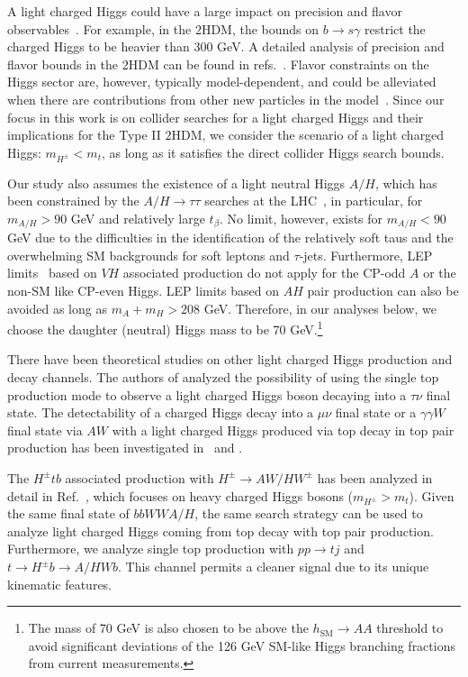  A light charged Higgs could have a large impact on precision and flavor observables~\cite{Olive2016}. For example, in the $2$HDM, the bounds on $b\rightarrow s\gamma$ restrict the charged Higgs to be heavier than 300 GeV. A detailed analysis of precision and flavor bounds in the $2$HDM can be found in refs.~\cite{Coleppa:2013dya,Mahmoudi:2009zx}. Flavor constraints on the Higgs sector are, however, typically model-dependent, and could be alleviated when there are contributions from other new particles in the model~\cite{Han:2013mga}. Since our focus in this work is on collider searches for a light charged Higgs and their implications for the Type II $2$HDM, we consider the scenario of a light charged Higgs: $m_{H^{\pm}}<m_t$, as long as it satisfies the direct collider Higgs search bounds.

Our study also assumes the existence of a light neutral Higgs $A/H$, which has been constrained by the $A/H \rightarrow \tau\tau$ searches at the LHC~\cite{Khachatryan:2014wca,Aad:2014vgg}, in particular, for $m_{A/H}>90$ GeV and relatively large $t_{\beta}$. No limit, however, exists for $m_{A/H}<90$ GeV due to the difficulties in the identification of the relatively soft taus and the overwhelming SM backgrounds for soft leptons and $\tau$-jets. Furthermore, LEP limits~\cite{LEP_Higgs} based on $VH$ associated production do not apply for the CP-odd $A$ or the non-SM like CP-even Higgs. LEP limits based on $AH$ pair production can also be avoided as long as $m_A+m_H>208$ GeV. Therefore, in our analyses below, we choose the daughter (neutral) Higgs mass to be 70 GeV.\footnote{The mass of 70 GeV is also chosen to be above the $h_\text{SM} \rightarrow AA$ threshold to avoid significant deviations of the 126 GeV SM-like Higgs branching fractions from current measurements.}

There have been theoretical studies on other light charged Higgs production and decay channels. The authors of \cite{Guedes:2012eu,Hashemi:2013kga} analyzed the possibility of using the single top production mode to observe a light charged Higgs boson decaying into a $\tau\nu$ final state. The detectability of a charged Higgs decay into a $ \mu \nu $ final state or a $\gamma\gamma W$ final state via $AW$ with a light charged Higgs produced via top decay in top pair production has been investigated in~\cite{Hashemi:2011gy} and \cite{Das:2014fha}. 

The $H^{\pm} tb$ associated production with $H^{\pm}\rightarrow AW/HW^{\pm} $ has been analyzed in detail in Ref.~\cite{Coleppa:2014cca}, which focuses on heavy charged Higgs bosons ($m_{H^{\pm}}>m_t$). Given the same final state of $bbWWA/H$, the same search strategy can be used to analyze light charged Higgs coming from top decay with top pair production. Furthermore, we analyze single top production with $pp \rightarrow tj$ and $t \rightarrow H^{\pm} b \rightarrow A/HWb $. This channel permits a cleaner signal due to its unique kinematic features. 



